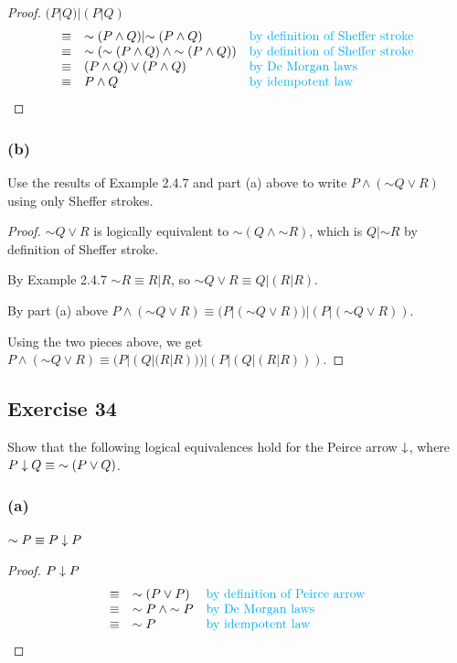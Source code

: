 \documentclass[14pt]{extarticle}
\begin{document}
\begin{proof} $(P | Q) | (P | Q)$ $$ \begin{array}{cll} \equiv & {\sim (P \wedge
Q)} | {\sim (P \wedge Q)} & \text{\color{cyan}by definition of Sheffer stroke}
\\ \equiv & {\sim ({\sim (P \wedge Q)} \wedge {\sim (P \wedge Q)})} &
\text{\color{cyan}by definition of Sheffer stroke} \\ \equiv & (P \wedge Q) \vee
(P \wedge Q) & \text{\color{cyan}by De Morgan laws} \\ \equiv & P \wedge Q &
\text{\color{cyan}by idempotent law} \\ \end{array} $$ \end{proof}

\subsubsection{(b)} Use the results of Example 2.4.7 and part (a) above to write
$P \wedge ({\sim Q} \vee R)$ using only Sheffer strokes.

\begin{proof} ${\sim Q} \vee R$ is logically equivalent to ${\sim (Q \wedge
{\sim R})}$, which is $Q | {\sim R}$ by definition of Sheffer stroke.

By Example 2.4.7 ${\sim R} \equiv R | R$, so ${\sim Q} \vee R \equiv Q | (R |
R)$.

By part (a) above $P \wedge ({\sim Q} \vee R) \equiv (P|({\sim Q} \vee R)) |
(P|({\sim Q} \vee R))$.

Using the two pieces above, we get $P \wedge ({\sim Q} \vee R) \equiv (P|(Q | (R
| R))) | (P|(Q | (R | R)))$. \end{proof}

\subsection{Exercise 34} Show that the following logical equivalences hold for
the Peirce arrow $\downarrow$, where $P \downarrow Q \equiv {\sim (P \vee Q)}$.

\subsubsection{(a)} ${\sim P} \equiv P \downarrow P$
\begin{proof} $P \downarrow P$ $$ \begin{array}{cll} \equiv & {\sim(P \vee P)} &
\text{\color{cyan}by definition of Peirce arrow} \\ \equiv & {\sim P} \wedge
{\sim P} & \text{\color{cyan}by De Morgan laws} \\ \equiv & {\sim P} &
\text{\color{cyan}by idempotent law} \\ \end{array} $$ \end{proof}
\end{document}

